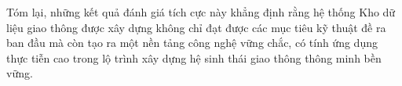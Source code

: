Tóm lại, những kết quả đánh giá tích cực này khẳng định rằng hệ thống Kho dữ liệu giao thông được xây dựng không chỉ đạt được các mục tiêu kỹ thuật đề ra ban đầu mà còn tạo ra một nền tảng công nghệ vững chắc, có tính ứng dụng thực tiễn cao trong lộ trình xây dựng hệ sinh thái giao thông thông minh bền vững.